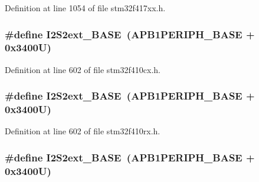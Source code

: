 Definition at line 1054 of file stm32f417xx.\+h.

\subsubsection[{\texorpdfstring{I2\+S2ext\+\_\+\+B\+A\+SE}{I2S2ext_BASE}}]{\setlength{\rightskip}{0pt plus 5cm}\#define I2\+S2ext\+\_\+\+B\+A\+SE~({\bf A\+P\+B1\+P\+E\+R\+I\+P\+H\+\_\+\+B\+A\+SE} + 0x3400\+U)}\hypertarget{group___peripheral__registers__structures_gaa5f7b241ed5b756decd835300c9e7bc9}{}\label{group___peripheral__registers__structures_gaa5f7b241ed5b756decd835300c9e7bc9}


Definition at line 602 of file stm32f410cx.\+h.

\subsubsection[{\texorpdfstring{I2\+S2ext\+\_\+\+B\+A\+SE}{I2S2ext_BASE}}]{\setlength{\rightskip}{0pt plus 5cm}\#define I2\+S2ext\+\_\+\+B\+A\+SE~({\bf A\+P\+B1\+P\+E\+R\+I\+P\+H\+\_\+\+B\+A\+SE} + 0x3400\+U)}\hypertarget{group___peripheral__registers__structures_gaa5f7b241ed5b756decd835300c9e7bc9}{}\label{group___peripheral__registers__structures_gaa5f7b241ed5b756decd835300c9e7bc9}


Definition at line 602 of file stm32f410rx.\+h.

\subsubsection[{\texorpdfstring{I2\+S2ext\+\_\+\+B\+A\+SE}{I2S2ext_BASE}}]{\setlength{\rightskip}{0pt plus 5cm}\#define I2\+S2ext\+\_\+\+B\+A\+SE~({\bf A\+P\+B1\+P\+E\+R\+I\+P\+H\+\_\+\+B\+A\+SE} + 0x3400\+U)}\hypertarget{group___peripheral__registers__structures_gaa5f7b241ed5b756decd835300c9e7bc9}{}\label{group___peripheral__registers__structures_gaa5f7b241ed5b756decd835300c9e7bc9}


